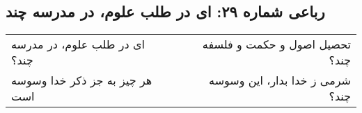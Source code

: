 \begin{center}
\section*{رباعی شماره ۲۹: ای در طلب علوم، در مدرسه چند}
\label{sec:029}
\begin{longtable}{l p{0.5cm} r}
ای در طلب علوم، در مدرسه چند؟
&&
تحصیل اصول و حکمت و فلسفه چند؟
\\
هر چیز به جز ذکر خدا وسوسه است
&&
شرمی ز خدا بدار، این وسوسه چند؟
\\
\end{longtable}
\end{center}
